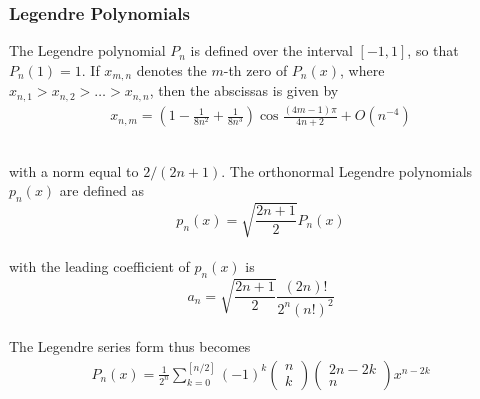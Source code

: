 \documentclass[%
reprint,nofootinbib,
amsmath,amssymb,
aps,
]{revtex4-1}
\begin{document}
\subsubsection{Legendre Polynomials} \noindent 
The Legendre polynomial $P_n$ is defined over the interval $[-1,1]$, so that $P_n(1) = 1$. If $x_{m,n}$ denotes the $m$-th zero of $P_n(x)$, where $x_{n,1} > x_{n,2} > \dots > x_{n,n} $, then the abscissas is given by \vspace{2mm} \\ 
\begin{align}\label{abs}
x_{n, m}=\left(1-\frac{1}{8 n^{2}}+\frac{1}{8 n^{3}}\right) \cos \frac{(4 m-1) \pi}{4 n+2}+O\left(n^{-4}\right) \nonumber \\ \nonumber \\ 
\end{align}\vspace{2mm} \\ 
with a norm equal to $2/(2n+1)$. The orthonormal Legendre polynomials $p_n(x)$ are defined as \vspace{2mm} \\
\begin{equation*}
p_{n}(x)=\sqrt{\frac{2 n+1}{2}} P_{n}(x)
\end{equation*}\vspace{2mm} \\
with the leading coefficient of $p_n(x)$ is \vspace{2mm} \\
\begin{equation*}
a_{n}=\sqrt{\frac{2 n+1}{2}} \frac{(2 n) !}{2^{n}(n !)^{2}}
\end{equation*}\vspace{2mm} \\
The Legendre series form thus becomes \vspace{2mm} \\
\begin{align}\label{polyleg}
P_{n}(x)=\frac{1}{2^{n}} \sum_{k=0}^{[n / 2]}(-1)^{k}\left(\begin{array}{l}{n} \\ {k}\end{array}\right)\left(\begin{array}{c}{2 n-2 k} \\ {n}\end{array}\right) x^{n-2 k} \nonumber \\ \nonumber \\ 
\end{align} 
\end{document}
